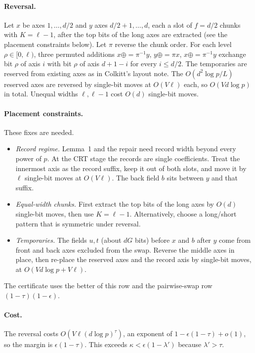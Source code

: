 \documentclass[11pt]{article}
\theoremstyle{remark}\newtheorem*{remark}{Remark}
\begin{document}
\paragraph{Reversal.} Let $x$ be axes $1,\dots,d/2$ and $y$ axes $d/2+1,\dots,d$, each a slot of
$f=d/2$ chunks with $K=\ell-1$, after the top bits of the long axes are extracted (see the placement constraints below). Let $\pi$ reverse the chunk order. For each level
$\rho\in[0,\ell)$, three permuted additions $x\oplus=\pi^{-1}y$, $y\oplus=\pi x$,
$x\oplus=\pi^{-1}y$ exchange bit $\rho$ of axis $i$ with bit $\rho$ of axis $d+1-i$ for every
$i\le d/2$. The temporaries are reserved from existing axes as in Colkitt's layout note. The
$O(d^2\log p/L)$ reserved axes are reversed by single-bit moves at $O(V\ell)$ each, so
$O(Vd\log p)$ in total. Unequal widths $\ell,\ell-1$ cost $O(d)$ single-bit moves.

\paragraph{Placement constraints.} These fixes are needed.
\begin{itemize}
\item \emph{Record regime.} Lemma~1 and the repair need record width beyond every power of $p$. At the CRT stage the records are single coefficients. Treat the innermost axis as the record suffix, keep it out of both slots, and move it by $\ell$ single-bit moves at $O(V\ell)$. The back field $b$ sits between $y$ and that suffix.
\item \emph{Equal-width chunks.} First extract the top bits of the long axes by $O(d)$ single-bit moves, then use $K=\ell-1$. Alternatively, choose a long/short pattern that is symmetric under reversal.
\item \emph{Temporaries.} The fields $u,t$ (about $dG$ bits) before $x$ and $b$ after $y$ come from front and back axes excluded from the swap. Reverse the middle axes in place, then re-place the reserved axes and the record axis by single-bit moves, at $O(Vd\log p+V\ell)$.
\end{itemize}
The certificate uses the better of this row and the pairwise-swap row $(1-\tau)(1-\epsilon)$.

\paragraph{Cost.} The reversal costs $O(V\ell(d\log p)^\tau)$, an exponent of
$1-\epsilon(1-\tau)+o(1)$, so the margin is $\epsilon(1-\tau)$. This exceeds
$\kappa<\epsilon(1-\lambda')$ because $\lambda'>\tau$.
\end{document}
